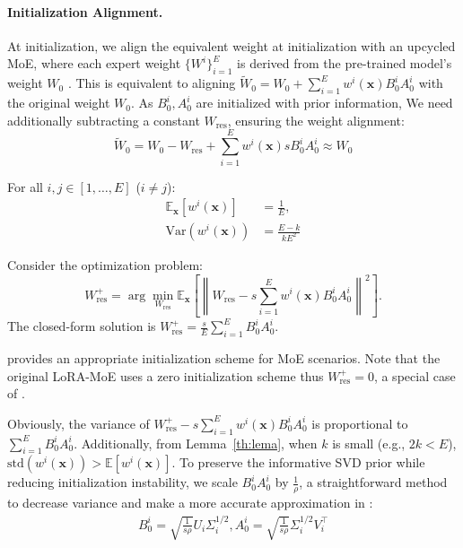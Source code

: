 \paragraph{Initialization Alignment.} 
At initialization, we align the equivalent weight at initialization with an upcycled MoE, where each expert weight $\{W^i\}_{i=1}^{E}$ is derived from the pre-trained model's weight $W_0$ \cite{he2024upcycling}. 
This is equivalent to aligning \( \tilde{W}_0 = W_0 + \sum_{i=1}^E w^i(\mathbf{x}) B^i_0 A^i_0 \) with the original weight \( W_0 \). 
As \(B^i_0,A^i_0\) are initialized with prior information,  
We need additionally subtracting a constant \( W_{\text{res}} \), ensuring the weight alignment:
\begin{equation}
    \tilde{W}_0 = W_0 - W_{\text{res}} + \sum_{i=1}^E w^i(\mathbf{x}) s B^i_0 A^i_0 \approx W_0\label{eq:wres_approx}
\end{equation}
\begin{lemma}\label{th:lema}
For all \( i, j \in [1, \dots, E]\) (\( i \neq j \)):
\begin{align}
\mathbb{E}_{\mathbf{x}}[w^i(\mathbf{x})] &= \frac{1}{E}, \\
\text{Var}(w^i(\mathbf{x})) &= \frac{E-k}{kE^2}
\end{align}
\end{lemma}
\begin{theorem}\label{th:wi}
Consider the optimization problem:
\begin{equation}
    W_{\text{res}}^+ = \arg\min_{W_{\text{res}}} \mathbb{E}_{\mathbf{x}} \left[ \left\| W_{\text{res}} - s \sum_{i=1}^E w^i(\mathbf{x}) B^i_0 A^i_0 \right\|^2 \right].
\end{equation}
The closed-form solution is \( W_{\text{res}}^+ = \frac{s}{E} \sum_{i=1}^E B^i_0 A^i_0 \).
\end{theorem}
 provides an appropriate initialization scheme for MoE scenarios. Note that the original LoRA-MoE \cite{zadouri2024pushing,tian2024hydraloraasymmetricloraarchitecture} uses a zero initialization scheme thus $W_{\text{res}}^+ =0$, a special case of .

Obviously, the variance of \( W_{\text{res}}^+ - s \sum_{i=1}^E w^i(\mathbf{x}) B^i_0 A^i_0 \) is proportional to \( \sum_{i=1}^E B^i_0 A^i_0 \).
Additionally, from Lemma~\ref{th:lema}, when \( k \) is small (e.g., \( 2k < E \)), \( \text{std}(w^i(\mathbf{x})) > \mathbb{E}[w^i(\mathbf{x})] \). To preserve the informative SVD prior while reducing initialization instability, we scale \( B^i_0 A^i_0 \) by \( \frac{1}{\rho} \), a straightforward method to decrease variance and make a more accurate approximation in :
\begin{align}
    B_0^i = \sqrt{\frac{1}{s\rho}} U_i \Sigma_i^{1/2}, A_0^i = \sqrt{\frac{1}{s\rho}} \Sigma_i^{1/2} V_i^\top \label{eq:initAB}
\end{align}

